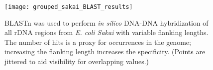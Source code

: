 \begin{figure}[H]
  \centering
  \hspace*{0cm}\texttt{[image: grouped\_sakai\_BLAST\_results]}
  \caption{BLASTn was used to perform \textit{in silico} DNA-DNA hybridization of all rDNA regions from \textit{E. coli Sakai} with variable flanking lengths. The number of hits is a proxy for occurrences in the genome; increasing the flanking length increases the specificity. (Points are jittered to aid visibility for overlapping values.)}
  \label{fig:blast}
\end{figure}
